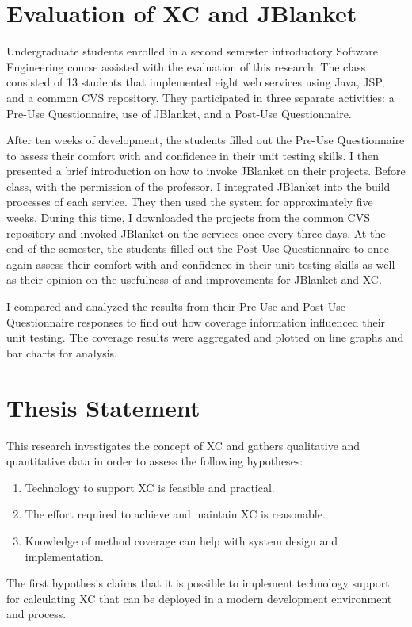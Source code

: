 \section{Evaluation of XC and JBlanket}
Undergraduate students enrolled in a second semester introductory Software
Engineering course assisted with the evaluation of this research.  The
class consisted of 13 students that implemented eight web services using
Java, JSP, and a common CVS repository.  They participated in three
separate activities: a Pre-Use Questionnaire, use of JBlanket, and a
Post-Use Questionnaire.

After ten weeks of development, the students filled out the Pre-Use
Questionnaire to assess their comfort with and confidence in their unit
testing skills.  I then presented a brief introduction on how to invoke
JBlanket on their projects.  Before class, with the permission of the
professor, I integrated JBlanket into the build processes of each service.
They then used the system for approximately five weeks.  During this time,
I downloaded the projects from the common CVS repository and invoked
JBlanket on the services once every three days.  At the end of the
semester, the students filled out the Post-Use Questionnaire to once again
assess their comfort with and confidence in their unit testing skills as
well as their opinion on the usefulness of and improvements for JBlanket
and XC.

I compared and analyzed the results from their Pre-Use and Post-Use
Questionnaire responses to find out how coverage information influenced
their unit testing.  The coverage results were aggregated and plotted on
line graphs and bar charts for analysis.

\section{Thesis Statement}
This research investigates the concept of XC and gathers qualitative and
quantitative data in order to assess the following hypotheses:
\begin{enumerate}
\item Technology to support XC is feasible and practical.
\item The effort required to achieve and maintain XC is reasonable.
\item Knowledge of method coverage can help with system design and
      implementation.
\end{enumerate}
The first hypothesis claims that it is possible to implement technology
support for calculating XC that can be deployed in a modern development
environment and process.

